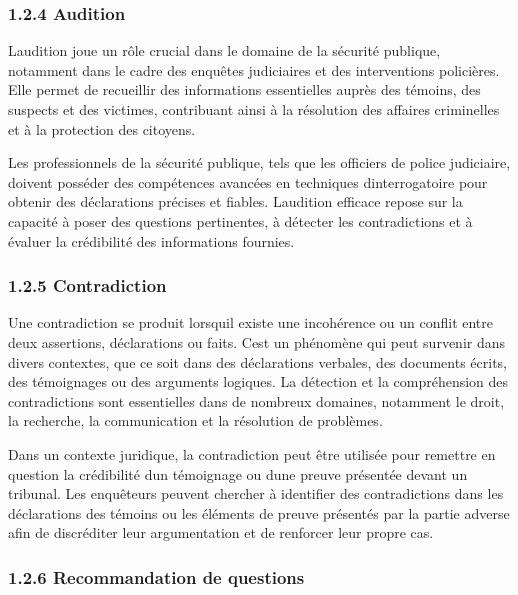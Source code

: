 \documentclass[
]{article}
\begin{document}
\subsubsection{1.2.4 Audition}\label{audition}

L\textquotesingle audition joue un rôle crucial dans le domaine de la
sécurité publique, notamment dans le cadre des enquêtes judiciaires et
des interventions policières. Elle permet de recueillir des informations
essentielles auprès des témoins, des suspects et des victimes,
contribuant ainsi à la résolution des affaires criminelles et à la
protection des citoyens.

Les professionnels de la sécurité publique, tels que les officiers de
police judiciaire, doivent posséder des compétences avancées en
techniques d\textquotesingle interrogatoire pour obtenir des
déclarations précises et fiables. L\textquotesingle audition efficace
repose sur la capacité à poser des questions pertinentes, à détecter les
contradictions et à évaluer la crédibilité des informations fournies.

\subsubsection{1.2.5 Contradiction}\label{contradiction}

Une contradiction se produit lorsqu\textquotesingle il existe une
incohérence ou un conflit entre deux assertions, déclarations ou faits.
C\textquotesingle est un phénomène qui peut survenir dans divers
contextes, que ce soit dans des déclarations verbales, des documents
écrits, des témoignages ou des arguments logiques. La détection et la
compréhension des contradictions sont essentielles dans de nombreux
domaines, notamment le droit, la recherche, la communication et la
résolution de problèmes.

Dans un contexte juridique, la contradiction peut être utilisée pour
remettre en question la crédibilité d\textquotesingle un témoignage ou
d\textquotesingle une preuve présentée devant un tribunal. Les
enquêteurs peuvent chercher à identifier des contradictions dans les
déclarations des témoins ou les éléments de preuve présentés par la
partie adverse afin de discréditer leur argumentation et de renforcer
leur propre cas.

\subsubsection{1.2.6 Recommandation de
questions}\label{recommandation-de-questions}
\end{document}

